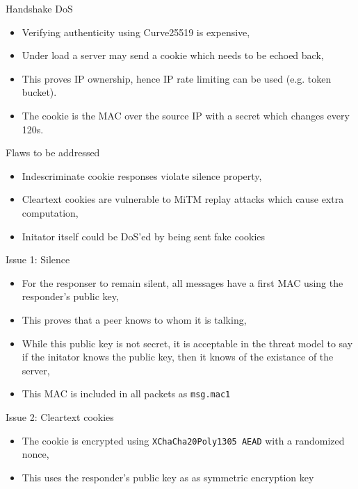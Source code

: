 \documentclass[xcolor=table]{beamer}
\begin{document}
    \begin{frame}{Handshake DoS}
    \begin{itemize}
        \item Verifying authenticity using Curve25519 is expensive,
        \item Under load a server may send a cookie which needs to be echoed back,
        \item This proves IP ownership, hence IP rate limiting can be used (e.g. token bucket).
        \item The cookie is the MAC over the source IP with a secret which changes every 120s.
    \end{itemize}
    \end{frame}

    \begin{frame}{Flaws to be addressed}
        \begin{itemize}
            \item Indescriminate cookie responses violate silence property,
            \item Cleartext cookies are vulnerable to MiTM replay attacks which cause extra computation,
            \item Initator itself could be DoS'ed by being sent fake cookies
        \end{itemize}
    \end{frame}

    \begin{frame}{Issue 1: Silence}
        \begin{itemize}
            \item For the responser to remain silent, all messages have a first MAC using the responder's public key,
            \item This proves that a peer knows to whom it is talking,
            \item While this public key is not secret, it is acceptable in the threat model to say if the initator knows the public key, then it knows of the existance of the server,
            \item This MAC is included in all packets as \texttt{msg.mac1}
        \end{itemize}
    \end{frame}

    \begin{frame}{Issue 2: Cleartext cookies}
    \begin{itemize}
        \item The cookie is encrypted using \texttt{XChaCha20Poly1305 AEAD} with a randomized nonce,
        \item This uses the responder's public key as as symmetric encryption key
    \end{itemize}
    \end{frame}
\end{document}

